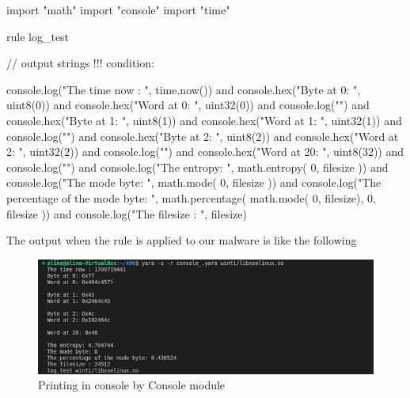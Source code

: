 
\begin{yaracode}

import "math"
import "console"
import "time"

rule log_test{
    // output strings !!!
    condition:
       
        console.log("The time now : ", time.now())
        and console.hex("Byte at 0: ", uint8(0))
        and console.hex("Word at 0: ", uint32(0))
        and console.log("")
        and console.hex("Byte at 1: ", uint8(1))
        and console.hex("Word at 1: ", uint32(1))
        and console.log("")
        and console.hex("Byte at 2: ", uint8(2))
        and console.hex("Word at 2: ", uint32(2))
        and console.log("")
        and console.hex("Word at 20: ", uint8(32))
        and console.log("")
        and console.log("The entropy: ", math.entropy( 0, filesize ))
        and console.log("The mode byte: ", math.mode( 0, filesize ))
        and console.log("The percentage of the mode byte: ", math.percentage( math.mode( 0, filesize), 0, filesize ))
        and console.log("The filesize : ", filesize)
        
}

\end{yaracode}
The output when the rule is applied to our malware is like the following
\\

\begin{figure}[H]

    \centering
    \includegraphics[width=\textwidth]{log.jpeg}
    \caption{Printing in console by Console module}
    \label{fig:file_console}
    
\end{figure}

